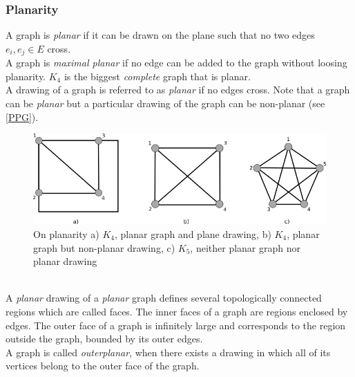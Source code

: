 \subsubsection{Planarity}
A graph is \textit{planar} if it can be drawn on the plane such that no two edges $e_i, e_j \in E$ cross.\\
A graph is \textit{maximal planar}  if no edge can be added to the graph without loosing planarity. $K_4$ is the biggest \textit{complete} graph that is planar.\\
A drawing of a graph is referred to as \textit{planar} if no edges cross. Note that a graph can be \textit{planar} but a particular drawing of the graph can be non-planar (see \autoref{PPG}).
\begin{figure}[h!]
\includegraphics[width =\textwidth]{figures/PlanarPlaneGraphs.png}
\caption{On planarity a) $K_4$, planar graph and plane drawing, b) $K_4$, planar graph but non-planar drawing, c) $K_5$, neither planar graph nor planar drawing}
\label{PPG}
\end{figure}\\
A \textit{planar} drawing of a \textit{planar} graph defines several topologically connected regions which are called faces. The inner faces of a graph are regions enclosed by edges. The outer face of a graph is infinitely large and corresponds to the region outside the graph, bounded by its outer edges.\\
\noindent A graph is called \textit{outerplanar}, when there exists a drawing in which all of its vertices belong to the outer face of the graph.
